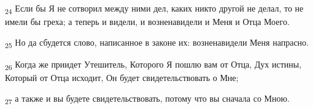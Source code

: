 \begin{tcolorbox}
\textsubscript{24} Если бы Я не сотворил между ними дел, каких никто другой не делал, то не имели бы греха; а теперь и видели, и возненавидели и Меня и Отца Моего.
\end{tcolorbox}
\begin{tcolorbox}
\textsubscript{25} Но да сбудется слово, написанное в законе их: возненавидели Меня напрасно.
\end{tcolorbox}
\begin{tcolorbox}
\textsubscript{26} Когда же приидет Утешитель, Которого Я пошлю вам от Отца, Дух истины, Который от Отца исходит, Он будет свидетельствовать о Мне;
\end{tcolorbox}
\begin{tcolorbox}
\textsubscript{27} а также и вы будете свидетельствовать, потому что вы сначала со Мною.
\end{tcolorbox}
